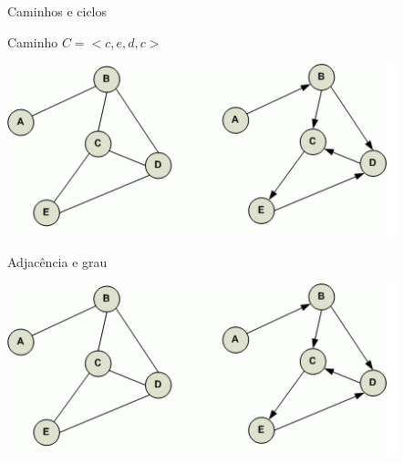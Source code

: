 \documentclass[compress,mathserif]{beamer}
\begin{document}

\begin{frame}{Caminhos e ciclos}

Caminho $C = <c, e, d, c>$

\vspace{1cm}

\centering \includegraphics[width=\textwidth]{images/caminhos.png}

\end{frame}


\begin{frame}{Adjacência e grau}

\vspace{1cm}

\centering \includegraphics[width=\textwidth]{images/caminhos.png}

\end{frame}

\end{document}
